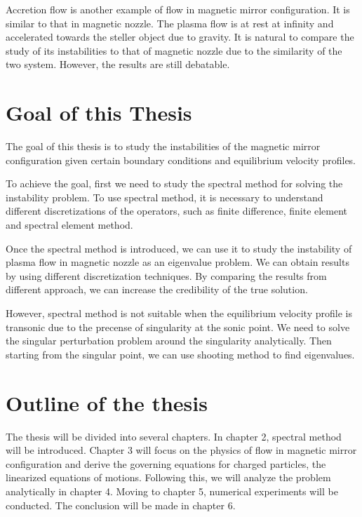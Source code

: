 Accretion flow is another example of flow in magnetic mirror configuration. It is similar to that in magnetic nozzle. The plasma flow is at rest at infinity and accelerated towards the steller object due to gravity. It is natural to compare the study of its instabilities to that of magnetic nozzle due to the similarity of the two system. However, the results are still debatable. \cite{keto_stability_2020,aikawa_stability_1979,stellingwerf_stability_1978}

\section{Goal of this Thesis}
The goal of this thesis is to study the instabilities of the magnetic mirror configuration given certain boundary conditions and equilibrium velocity profiles.

To achieve the goal, first we need to study the spectral method for solving the instability problem. To use spectral method, it is necessary to understand different discretizations of the operators, such as finite difference, finite element and spectral element method.

Once the spectral method is introduced, we can use it to study the instability of plasma flow in magnetic nozzle as an eigenvalue problem. We can obtain results by using different discretization techniques. By comparing the results from different approach, we can increase the credibility of the true solution.

However, spectral method is not suitable when the equilibrium velocity profile is transonic due to the precense of singularity at the sonic point. We need to solve the singular perturbation problem around the singularity analytically. Then starting from the singular point, we can use shooting method to find eigenvalues.

\section{Outline of the thesis}
The thesis will be divided into several chapters. In chapter 2, spectral method will be introduced. Chapter 3 will focus on the physics of flow in magnetic mirror configuration and derive the governing equations for charged particles, the linearized equations of motions. Following this, we will analyze the problem analytically in chapter 4. Moving to chapter 5, numerical experiments will be conducted. The conclusion will be made in chapter 6.
